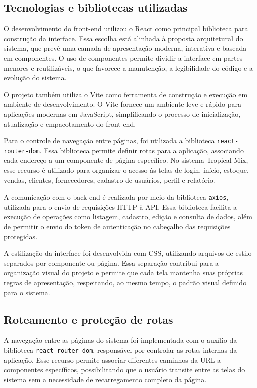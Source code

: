 \subsection{Tecnologias e bibliotecas utilizadas}

O desenvolvimento do front-end utilizou o React como principal biblioteca para construção da interface. Essa escolha está alinhada à proposta arquitetural do sistema, que prevê uma camada de apresentação moderna, interativa e baseada em componentes. O uso de componentes permite dividir a interface em partes menores e reutilizáveis, o que favorece a manutenção, a legibilidade do código e a evolução do sistema.

O projeto também utiliza o Vite como ferramenta de construção e execução em ambiente de desenvolvimento. O Vite fornece um ambiente leve e rápido para aplicações modernas em JavaScript, simplificando o processo de inicialização, atualização e empacotamento do front-end.

Para o controle de navegação entre páginas, foi utilizada a biblioteca \texttt{react-router-dom}. Essa biblioteca permite definir rotas para a aplicação, associando cada endereço a um componente de página específico. No sistema Tropical Mix, esse recurso é utilizado para organizar o acesso às telas de login, início, estoque, vendas, clientes, fornecedores, cadastro de usuários, perfil e relatório.

A comunicação com o back-end é realizada por meio da biblioteca \texttt{axios}, utilizada para o envio de requisições HTTP à API. Essa biblioteca facilita a execução de operações como listagem, cadastro, edição e consulta de dados, além de permitir o envio do token de autenticação no cabeçalho das requisições protegidas.

A estilização da interface foi desenvolvida com CSS, utilizando arquivos de estilo separados por componente ou página. Essa separação contribui para a organização visual do projeto e permite que cada tela mantenha suas próprias regras de apresentação, respeitando, ao mesmo tempo, o padrão visual definido para o sistema.

\subsection{Roteamento e proteção de rotas}
A navegação entre as páginas do sistema foi implementada com o auxílio da biblioteca \texttt{react-router-dom}, responsável por controlar as rotas internas da aplicação. Esse recurso permite associar diferentes caminhos da URL a componentes específicos, possibilitando que o usuário transite entre as telas do sistema sem a necessidade de recarregamento completo da página.

